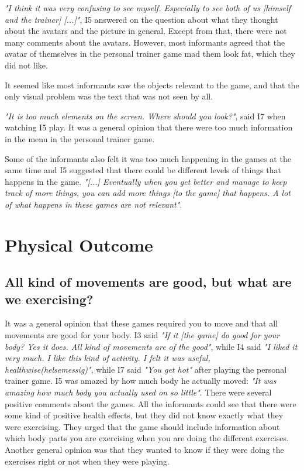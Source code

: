\emph{"I think it was very confusing to see myself. Especially to see both of us [himself and the trainer] [...]"}, I5 answered on the question about what they thought about the avatars and the picture in general. Except from that, there were not many comments about the avatars. However, most informants agreed that the avatar of themselves in the personal trainer game mad them look fat, which they did not like. 

It seemed like most informants saw the objects relevant to the game, and that the only visual problem was the text that was not seen by all.

\emph{"It is too much elements on the screen. Where should you look?"}, said I7 when watching I5 play. It was a general opinion that there were too much information in the menu in the personal trainer game. 

Some of the informants also felt it was too much happening in the games at the same time and I5 suggested that there could be different levels of things that happens in the game. \emph{"[...] Eventually when you get better and manage to keep track of more things, you can add more things [to the game] that happens. A lot of what happens in these games are not relevant"}.

\section{Physical Outcome}

\subsection{All kind of movements are good, but what are we exercising?}
It was a general opinion that these games required you to move and that all movements are good for your body. I3 said \emph{"If it [the game] do good for your body? Yes it does. All kind of movements are of the good"}, while I4 said  \emph{"I liked it very much. I like this kind of activity. I felt it was useful, healthwise(helsemessig)"}, while I7 said \emph{"You get hot"} after playing the personal trainer game. I5 was amazed by how much body he actually moved: \emph{"It was amazing how much body you actually used on so little"}. There were several positive comments about the games. All the informants could see that there were some kind of positive health effects, but they did not know exactly what they were exercising. They urged that the game should include information about which body parts you are exercising when you are doing the different exercises. Another general opinion was that they wanted to know if they were doing the exercises right or not when they were playing. 


